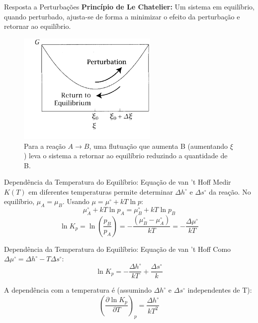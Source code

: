 \documentclass{beamer}
\begin{document}
\begin{frame}{Resposta a Perturbações}
        \textbf{Princípio de Le Chatelier:} Um sistema em equilíbrio, quando perturbado, ajusta-se de forma a minimizar o efeito da perturbação e retornar ao equilíbrio.
        \begin{figure}
        \centering
        \includegraphics[width=0.6\textwidth]{figs/lechatelier.png}
        \caption{Para a reação $A \rightarrow B$, uma flutuação que aumenta B (aumentando $\xi$) leva o sistema a retornar ao equilíbrio reduzindo a quantidade de B.}
        \end{figure}
\end{frame}

\begin{frame}{Dependência da Temperatura do Equilíbrio: Equação de van 't Hoff}
    Medir $K(T)$ em diferentes temperaturas permite determinar $\Delta h^{\circ}$ e $\Delta s^{\circ}$ da reação.
    No equilíbrio, $\mu_A = \mu_B$. Usando $\mu = \mu^{\circ} + kT \ln p$:
    $$ \mu_A^{\circ} + kT \ln p_A = \mu_B^{\circ} + kT \ln p_B $$
    $$ \ln K_p = \ln\left(\frac{p_B}{p_A}\right) = -\frac{(\mu_B^{\circ} - \mu_A^{\circ})}{kT} = -\frac{\Delta\mu^{\circ}}{kT} $$
     
\end{frame}

\begin{frame}{Dependência da Temperatura do Equilíbrio: Equação de van 't Hoff}
    Como $\Delta\mu^{\circ} = \Delta h^{\circ} - T\Delta s^{\circ}$:
    $$ \ln K_p = -\frac{\Delta h^{\circ}}{kT} + \frac{\Delta s^{\circ}}{k} $$
     
    A dependência com a temperatura é (assumindo $\Delta h^{\circ}$ e $\Delta s^{\circ}$ independentes de T):
    $$ \left(\frac{\partial \ln K_p}{\partial T}\right)_p = \frac{\Delta h^{\circ}}{kT^2} $$
     
\end{frame}
\end{document}
